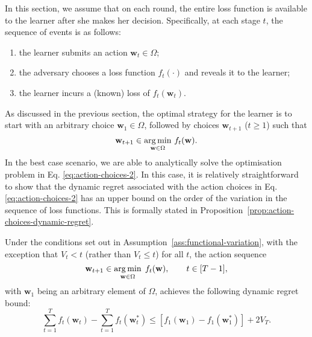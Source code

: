 In this section, we assume that on each round, the entire loss function is available to the learner after she makes her decision. Specifically, at each stage $t$, the sequence of events is as follows:
\begin{enumerate}
	\item the learner submits an action $\mathbf{w}_t \in \Omega$;
	\item the adversary chooses a loss function $f_t(\cdot)$ and reveals it to the learner;
	\item the learner incurs a (known) loss of $f_t(\mathbf{w}_t)$.
\end{enumerate}
As discussed in the previous section, the optimal strategy for the learner is to start with an arbitrary choice $\mathbf{w}_1 \in \Omega$, followed by choices $\mathbf{w}_{t+1}$ ($t \geq 1$) such that
\begin{equation}
\label{eq:action-choices-2}
	\mathbf{w}_{t+1} \in \operatorname*{arg\,min}_{\mathbf{w} \in \Omega} \, f_t(\mathbf{w}).
\end{equation}
In the best case scenario, we are able to analytically solve the optimisation problem in Eq. \eqref{eq:action-choices-2}. In this case, it is relatively straightforward to show that the dynamic regret associated with the action choices in Eq. \eqref{eq:action-choices-2} has an upper bound on the order of the variation in the sequence of loss functions. This is formally stated in Proposition~\ref{prop:action-choices-dynamic-regret}.
\begin{mccorrection}
\begin{proposition}
\label{prop:action-choices-dynamic-regret}
Under the conditions set out in Assumption~\ref{ass:functional-variation}, with the exception that $V_t < t$ (rather than $V_t \leq t$) for all $t$, the action sequence
\begin{equation}
	\mathbf{w}_{t+1} \in \operatorname*{arg\,min}_{\mathbf{w}\in\Omega}\; f_t(\mathbf{w}), \qquad t \in [T-1],
\end{equation}
with $\mathbf{w}_1$ being an arbitrary element of $\Omega$, achieves the following dynamic regret bound:
\begin{equation}
	\sum_{t=1}^T f_t(\mathbf{w}_t) - \sum_{t=1}^T f_t(\mathbf{w}_t^*) \leq [f_1(\mathbf{w}_1) - f_1(\mathbf{w}_1^*)] + 2V_T.
\end{equation}
\end{proposition}
\end{mccorrection}
